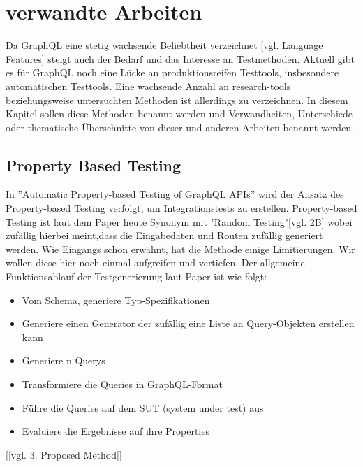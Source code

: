 \chapter{verwandte Arbeiten}

Da GraphQL eine stetig wachsende Beliebtheit verzeichnet \cite{graphql-growing-report}[vgl. Language Features] steigt auch der Bedarf und das Interesse an Testmethoden.
Aktuell gibt es für GraphQL noch eine Lücke an produktionsreifen Testtools, insbesondere automatischen Testtools.
Eine wachsende Anzahl an research-tools beziehungsweise untersuchten Methoden ist allerdings zu verzeichnen.
In diesem Kapitel sollen diese Methoden benannt werden und Verwandheiten, Unterschiede oder thematische Überschnitte von dieser und anderen Arbeiten benannt werden.

\section{Property Based Testing}

In ''Automatic Property-based Testing of GraphQL APIs''\cite{property-based-testing} wird der Ansatz des Property-based Testing verfolgt, um Integrationstests zu erstellen.
Property-based Testing ist laut dem Paper heute Synonym mit "Random Testing"\cite{property-based-testing}[vgl. 2B] wobei zufällig hierbei meint,dass die Eingabedaten und Routen zufällig generiert werden.
Wie Eingangs schon erwähnt, hat die Methode einige Limitierungen.
Wir wollen diese hier noch einmal aufgreifen und vertiefen.
Der allgemeine Funktionsablauf der Testgenerierung laut Paper ist wie folgt:

\begin{center}
    \begin{itemize}
        \item[1.] Vom Schema, generiere Typ-Spezifikationen
        \item[2.] Generiere einen Generator der zufällig eine Liste an Query-Objekten erstellen kann
        \item[3.] Generiere n Querys
        \item[4.] Transformiere die Queries in GraphQL-Format
        \item[5.] Führe die Queries auf dem SUT (system under test) aus
        \item[6.] Evaluiere die Ergebnisse auf ihre Properties
    \end{itemize}[\cite{property-based-testing}[vgl. 3. Proposed Method]]
\end{center}

